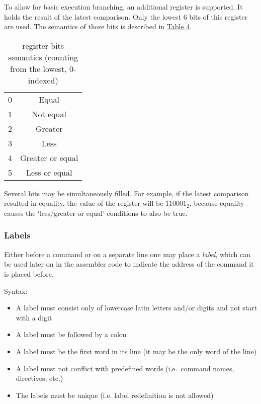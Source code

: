 To allow for basic execution branching, an additional  register is supported.
It holds the result of the latest comparison.
Only the lowest 6 bits of this register are used.
The semantics of those bits is described in \hyperlink{flags:bits}{Table 4}.

\hypertarget{flags:bits}{}
{
    \renewcommand{\arraystretch}{1.4}
    \begin{table}[h!]
        \centering
        \caption{ register bits semantics (counting from the lowest, 0-indexed)}
        \vspace{2mm}
        \begin{tabular}{| c | c |}
            \hline
            0 & Equal            \\
            1 & Not equal        \\
            2 & Greater          \\
            3 & Less             \\
            4 & Greater or equal \\
            5 & Less or equal    \\
            \hline
        \end{tabular}
    \end{table}
}

Several bits may be simultaneously filled.
For example, if the latest comparison resulted in equality, the value of the  register will be $110001_2$, because equality causes the `less/greater or equal' conditions to also be true.

\subsubsection{Labels}

Either before a command or on a separate line one may place a \textit{label}, which can be used later on in the assembler code to indicate the address of the command it is placed before.

Syntax:

\begin{itemize}
	\item A label must consist only of lowercase latin letters and/or digits and not start with a digit
	\item A label must be followed by a colon
    \item A label must be the first word in its line (it may be the only word of the line)
    \item A label must not conflict with predefined words (i.e.\ command names, directives, etc.)
	\item The labels must be unique (i.e. label redefinition is not allowed)
\end{itemize}

